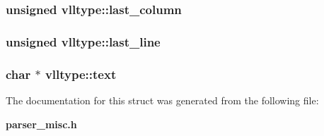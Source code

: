 \subsubsection{\setlength{\rightskip}{0pt plus 5cm}unsigned vlltype::last\_\-column}\label{structvlltype_m3}


\subsubsection{\setlength{\rightskip}{0pt plus 5cm}unsigned vlltype::last\_\-line}\label{structvlltype_m2}


\subsubsection{\setlength{\rightskip}{0pt plus 5cm}char $\ast$ vlltype::text}\label{structvlltype_m4}




The documentation for this struct was generated from the following file:\begin{CompactItemize}
\item 
{\bf parser\_\-misc.h}\end{CompactItemize}
